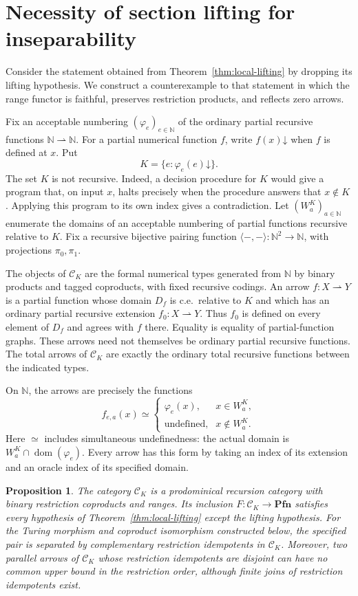 \documentclass[11pt]{article}
\newtheorem{proposition}[theorem]{Proposition}
\newcommand{\N}{\mathbb N}
\newcommand{\Pfn}{\mathbf{Pfn}}
\begin{document}
\section{Necessity of section lifting for inseparability}
\label{app:lifting-counterexample}

Consider the statement obtained from Theorem~\ref{thm:local-lifting}
by dropping its lifting hypothesis. We construct a counterexample to
that statement in which the range functor is faithful, preserves
restriction products, and reflects zero arrows.

Fix an acceptable numbering $(\varphi_e)_{e\in\N}$ of the ordinary
partial recursive functions $\N\rightharpoonup\N$. For a partial
numerical function $f$, write $f(x)\mathord\downarrow$ when $f$ is
defined at $x$. Put
\[
 K=\{e:\varphi_e(e)\mathord\downarrow\}.
\]
The set $K$ is not recursive. Indeed, a decision procedure for $K$
would give a program that, on input $x$, halts precisely when the
procedure answers that $x\notin K$. Applying this program to its own
index gives a contradiction.
Let $(W_a^K)_{a\in\N}$ enumerate the domains of an acceptable
numbering of partial functions recursive relative to $K$.
Fix a recursive bijective pairing function
$\langle-,-\rangle:\N^2\to\N$, with projections $\pi_0,\pi_1$.

The objects of $\mathcal C_K$ are the formal numerical types generated
from $\N$ by binary products and tagged coproducts, with fixed recursive
codings. An arrow $f:X\rightharpoonup Y$ is a partial function whose
domain $D_f$ is c.e.\ relative to $K$ and which has an ordinary partial
recursive extension $f_0:X\rightharpoonup Y$. Thus $f_0$ is defined
on every element of $D_f$ and agrees with $f$ there. Equality is equality
of partial-function graphs. These arrows need not themselves be ordinary
partial recursive functions. The total arrows of $\mathcal C_K$ are exactly
the ordinary total recursive functions between the indicated types.

On $\N$, the arrows are precisely the functions
\[
 f_{e,a}(x)\simeq
 \begin{cases}
  \varphi_e(x),&x\in W_a^K,\\
  \text{undefined},&x\notin W_a^K.
 \end{cases}
\]
Here $\simeq$ includes simultaneous undefinedness: the actual domain
is $W_a^K\cap\operatorname{dom}(\varphi_e)$. Every arrow has this
form by taking an index of its extension and an oracle index of its
specified domain.

\begin{proposition}\label{prop:missing-lift}
The category $\mathcal C_K$ is a prodominical recursion category with
binary restriction coproducts and ranges. Its inclusion
$F:\mathcal C_K\to\Pfn$ satisfies every hypothesis of
Theorem~\ref{thm:local-lifting} except the lifting hypothesis.
For the Turing morphism and coproduct isomorphism constructed below,
the specified pair is separated by complementary restriction idempotents in
$\mathcal C_K$. Moreover, two parallel arrows of $\mathcal C_K$
whose restriction idempotents are disjoint can have no common upper
bound in the restriction order, although finite joins of restriction
idempotents exist.
\end{proposition}
\end{document}
